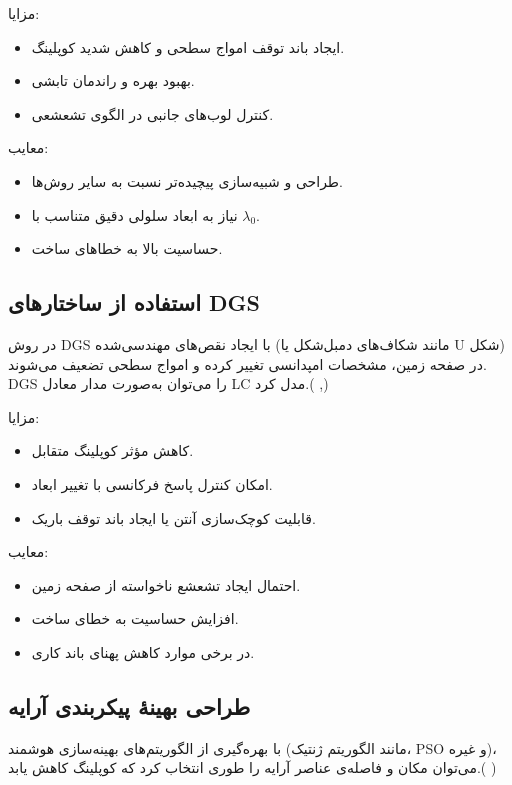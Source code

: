 	
			مزایا:
	\begin{itemize}
		\item{
		ایجاد باند توقف امواج سطحی و کاهش شدید کوپلینگ.	
		}
		\item{
			بهبود بهره و راندمان تابشی.
		}
		\item {
		کنترل لوب‌های جانبی در الگوی تشعشعی.
		}
	\end{itemize}
	معایب:
	\begin{itemize}
	\item{
طراحی و شبیه‌سازی پیچیده‌تر نسبت به سایر روش‌ها.
	}
	\item{
نیاز به ابعاد سلولی دقیق متناسب با 
$\lambda_0$.
	}
	\item {
حساسیت بالا به خطاهای ساخت.
	}
\end{itemize}	

\subsection{
	استفاده از ساختارهای  DGS
}
در روش
DGS
 با ایجاد نقص‌های مهندسی‌شده (مانند شکاف‌های دمبل‌شکل یا U شکل) در صفحه زمین، مشخصات امپدانسی تغییر کرده و امواج سطحی تضعیف می‌شوند. DGS را می‌توان به‌صورت مدار معادل LC مدل کرد.(
\cite{hajilou2012mutual},\cite{ibrahim2014compact})


			مزایا:
	\begin{itemize}
		\item{
کاهش مؤثر کوپلینگ متقابل.
		}
		\item{
امکان کنترل پاسخ فرکانسی با تغییر ابعاد.
		}
		\item {
		قابلیت کوچک‌سازی آنتن یا ایجاد باند توقف باریک.
		}
	\end{itemize}

معایب:
\begin{itemize}
	\item {
		احتمال ایجاد تشعشع ناخواسته از صفحه زمین.
	}
	\item {
	افزایش حساسیت به خطای ساخت.
	}
	\item {
	در برخی موارد کاهش پهنای باند کاری.
	}
\end{itemize}

\subsection{
	طراحی بهینهٔ پیکربندی آرایه
}
با بهره‌گیری از الگوریتم‌های بهینه‌سازی هوشمند (مانند الگوریتم ژنتیک، PSO و غیره)، می‌توان مکان و فاصله‌ی عناصر آرایه را طوری انتخاب کرد که کوپلینگ کاهش یابد.(
\cite{ghadimi2020systematic})


